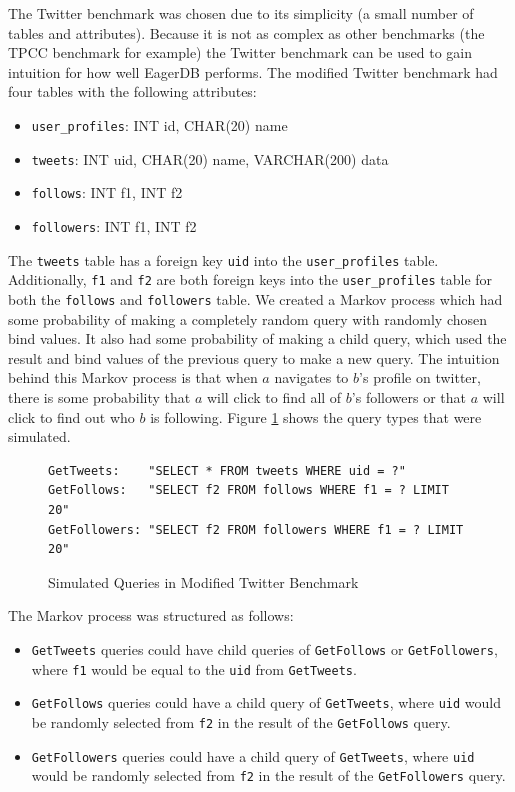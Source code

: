 \documentclass[12pt]{article}
\begin{document}
The Twitter benchmark was chosen due to its simplicity (a small number of tables and attributes). Because it is not as complex as other benchmarks (the TPCC benchmark for example) the Twitter benchmark can be used to gain intuition for how well EagerDB performs. The modified Twitter benchmark had four tables with the following attributes:

\begin{itemize}
  \item \texttt{user\_profiles}: INT id, CHAR(20) name
  \item \texttt{tweets}: INT uid, CHAR(20) name, VARCHAR(200) data
  \item \texttt{follows}: INT f1, INT f2
  \item \texttt{followers}: INT f1, INT f2
\end{itemize}

The \texttt{tweets} table has a foreign key \texttt{uid} into the \texttt{user\_profiles} table. Additionally, \texttt{f1} and \texttt{f2} are both foreign keys into the \texttt{user\_profiles} table for both the \texttt{follows} and \texttt{followers} table. We created a Markov process which had some probability of making a completely random query with randomly chosen bind values. It also had some probability of making a child query, which used the result and bind values of the previous query to make a new query. The intuition behind this Markov process is that when $a$ navigates to $b$'s profile on twitter, there is some probability that $a$ will click to find all of $b$'s followers or that $a$ will click to find out who $b$ is following. Figure \ref{fig:queries-simulated} shows the query types that were simulated.

\begin{figure}[h]
\begin{lstlisting}[frame=single]
GetTweets:    "SELECT * FROM tweets WHERE uid = ?"
GetFollows:   "SELECT f2 FROM follows WHERE f1 = ? LIMIT 20"
GetFollowers: "SELECT f2 FROM followers WHERE f1 = ? LIMIT 20"
\end{lstlisting}
\caption{\label{fig:queries-simulated}Simulated Queries in Modified Twitter Benchmark}
\end{figure}

The Markov process was structured as follows:
\begin{itemize}
  \item \texttt{GetTweets} queries could have child queries of \texttt{GetFollows} or \texttt{GetFollowers}, where \texttt{f1} would be equal to the \texttt{uid} from \texttt{GetTweets}.
  \item \texttt{GetFollows} queries could have a child query of \texttt{GetTweets}, where \texttt{uid} would be randomly selected from \texttt{f2} in the result of the \texttt{GetFollows} query.
  \item \texttt{GetFollowers} queries could have a child query of \texttt{GetTweets}, where \texttt{uid} would be randomly selected from \texttt{f2} in the result of the \texttt{GetFollowers} query.
\end{itemize}
\end{document}
